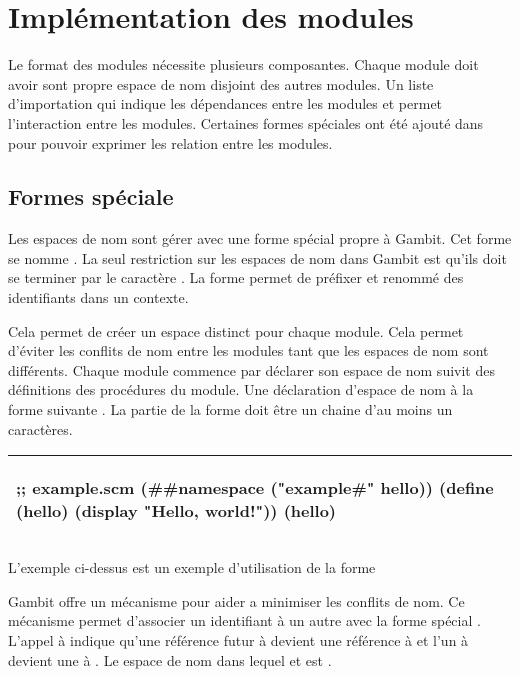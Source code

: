 
\chapter{Implémentation des modules}

Le format des modules nécessite plusieurs composantes.
Chaque module doit avoir sont propre espace de nom
disjoint des autres modules. Un liste d'importation
qui indique les dépendances entre les modules et permet
l'interaction entre les modules. Certaines formes spéciales
ont été ajouté dans pour pouvoir exprimer les relation entre
les modules.

\section{Formes spéciale}

Les espaces de nom sont gérer avec une forme spécial propre à Gambit. Cet forme
se nomme .  La seul restriction sur les espaces de nom
dans Gambit est qu'ils doit se terminer par le caractère \lstcode{#}.
La forme  permet de préfixer et renommé des identifiants
dans un contexte.

Cela permet de créer un espace distinct pour chaque module. Cela permet
d'éviter les conflits de nom entre les modules tant que les espaces de nom sont
différents. Chaque module commence par déclarer son espace de nom suivit des
définitions des procédures du module. Une déclaration d'espace de nom à la forme
suivante . La partie  de la
forme  doit être un chaine d'au moins un caractères.

\begin{center}
  \begin{tabular}{|l|}
\hline
\begin{mplisting}{0.6}
;; example.scm
(##namespace ("example#" hello))
(define (hello)
  (display "Hello, world!\n"))
(hello)
\end{mplisting}\\\hline
  \end{tabular}
\end{center}
L'exemple ci-dessus est un exemple d'utilisation de la forme 











Gambit offre un mécanisme pour aider a minimiser les conflits de nom. Ce
mécanisme permet d'associer un identifiant à un autre avec la forme spécial
.  L'appel à  indique
qu'une référence futur à  devient une référence à
 et l'un à  devient une à . Le espace
de nom dans lequel  et  est .

